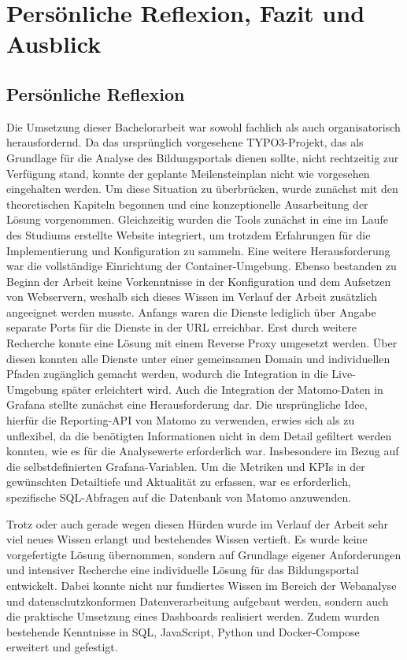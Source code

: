 

\chapter{Persönliche Reflexion, Fazit und Ausblick}
\label{ch:zusammenfassung}

\section{Persönliche Reflexion}
Die Umsetzung dieser Bachelorarbeit war sowohl fachlich als auch organisatorisch herausfordernd. Da das ursprünglich vorgesehene TYPO3-Projekt, das als Grundlage für die Analyse des Bildungsportals dienen sollte, nicht rechtzeitig zur Verfügung stand, konnte der geplante Meilensteinplan nicht wie vorgesehen eingehalten werden. Um diese Situation zu überbrücken, wurde zunächst mit den theoretischen Kapiteln begonnen und eine konzeptionelle Ausarbeitung der Lösung vorgenommen. Gleichzeitig wurden die Tools zunächst in eine im Laufe des Studiums erstellte Website integriert, um trotzdem Erfahrungen für die Implementierung und Konfiguration zu sammeln. Eine weitere Herausforderung war die vollständige Einrichtung der Container-Umgebung. Ebenso bestanden zu Beginn der Arbeit keine Vorkenntnisse in der Konfiguration und dem Aufsetzen von Webservern, weshalb sich dieses Wissen im Verlauf der Arbeit zusätzlich angeeignet werden musste. Anfangs waren die Dienste lediglich über Angabe separate Ports für die Dienste in der URL erreichbar. Erst durch weitere Recherche konnte eine Lösung mit einem Reverse Proxy umgesetzt werden. Über diesen konnten alle Dienste unter einer gemeinsamen Domain und individuellen Pfaden zugänglich gemacht werden, wodurch die Integration in die Live-Umgebung später erleichtert wird. Auch die Integration der Matomo-Daten in Grafana stellte zunächst eine Herausforderung dar. Die ursprüngliche Idee, hierfür die Reporting-API von Matomo zu verwenden, erwies sich als zu unflexibel, da die benötigten Informationen nicht in dem Detail gefiltert werden konnten, wie es für die Analysewerte erforderlich war. Insbesondere im Bezug auf die selbstdefinierten Grafana-Variablen. Um die Metriken und KPIs in der gewünschten Detailtiefe und Aktualität zu erfassen, war es erforderlich, spezifische SQL-Abfragen auf die Datenbank von Matomo anzuwenden. 

Trotz oder auch gerade wegen diesen Hürden wurde im Verlauf der Arbeit sehr viel neues Wissen erlangt und bestehendes Wissen vertieft. Es wurde keine vorgefertigte Lösung übernommen, sondern auf Grundlage eigener Anforderungen und intensiver Recherche eine individuelle Lösung für das Bildungsportal entwickelt. Dabei konnte nicht nur fundiertes Wissen im Bereich der Webanalyse und datenschutzkonformen Datenverarbeitung aufgebaut werden, sondern auch die praktische Umsetzung eines Dashboards realisiert werden. Zudem wurden bestehende Kenntnisse in SQL, JavaScript, Python und Docker-Compose erweitert und gefestigt.


